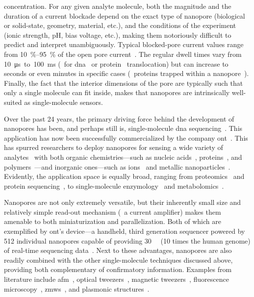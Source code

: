 concentration. For any given analyte molecule, both the magnitude and the duration of a current blockade
depend on the exact type of nanopore (biological or solid-state, geometry, material, etc.), and the conditions
of the experiment (ionic strength, pH, bias voltage, etc.), making them notoriously difficult to predict and
interpret unambiguously. Typical blocked-pore current values range from \SIrange{10}{95}{\percent} of the open
pore current~\cite{Fragasso-2020,Zernia-2020,Howorka-2009}. The regular dwell times vary from
\SI{10}{\us}~to~\SI{100}{\ms} (\eg~for \gls{dna}~\cite{Maglia-2010} or protein~\cite{Watanabe-2017}
translocation) but can increase to seconds or even minutes in specific cases (\eg~proteins trapped within a
nanopore~\cite{Soskine-2012}). Finally, the fact that the interior dimensions of the pore are typically such
that only a single molecule can fit inside, makes that nanopores are intrinsically well-suited as
single-molecule sensors.

Over the past 24 years, the primary driving force behind the development of nanopores has been, and perhaps
still is, single-molecule \gls{dna} sequencing~\cite{Deamer-2016}. This application has now been successfully
commercialized by the company \gls{ont}~\cite{ONT-2020,Jain-2018}. This has spurred researchers to deploy
nanopores for sensing a wide variety of analytes~\cite{Wang-2018} with both organic chemistries---such as
nucleic acids~\cite{Kasianowicz-1996,Meller-2000,Stoddart-2009,Manrao-2012},
proteins~\cite{Mohammad-2008,Firnkes-2010,Spiering-2011,RodriguezLarrea-2013}, and
polymers~\cite{Robertson-2007,Baaken-2011}---and inorganic ones---such as
ions~\cite{Bezrukov-1993,Kasianowicz-1995,Kasianowicz-1999,Ali-2011,Roozbahani-2020} and metallic
nanoparticles~\cite{Astier-2009,Angevine-2014,Campos-2018}. Evidently, the application space is equally broad,
ranging from proteomics~\cite{Yusko-2017,Houghtaling-2019} and protein
sequencing~\cite{Restrepo-Perez-2018,Huang-2019}, to single-molecule
enzymology~\cite{Willems-VanMeervelt-2017,Ho-2015,Wloka-2017,Harrington-2019,Galenkamp-2020} and
metabolomics~\cite{VanMeervelt-2017,Zernia-2020}.

Nanopores are not only extremely versatile, but their inherently small size and relatively simple read-out
mechanism (\ie~a current amplifier) makes them amenable to both miniaturization and parallelization. Both of
which are exemplified by \gls{ont}'s  device---a handheld, third generation sequencer powered by
\num{512} individual nanopores capable of providing \SI{30}{\giga\bp} (10 times the human genome) of real-time
sequencing data~\cite{ONT-2020}. Next to these advantages, nanopores are also readily combined with the other
single-molecule techniques discussed above, providing both complementary of confirmatory information. Examples
from literature include \gls{afm}~\cite{Aramesh-2019}, optical
tweezers~\cite{Keyser-2006,vanDorp-2009,Hall-2009,Galla-2014}, magnetic tweezers~\cite{Peng-2009},
fluorescence microscopy~\cite{McNally-2010,Anderson-2014,Assad-2014,Huang-2015},
\glspl{zmw}~\cite{Auger-2014,Larkin-2017,Spitzberg-2019}, and plasmonic
structures~\cite{Im-2010,Chen-2018,Verschueren-2018,Garoli-2019}.


